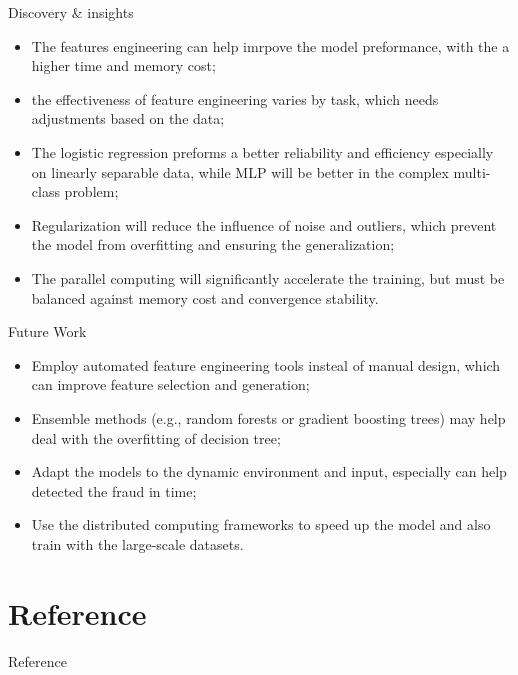\documentclass{beamer}
\begin{document}
\begin{frame}{Discovery \& insights}

  \begin{itemize}
    \item The features engineering can help imrpove the model preformance, with the a higher time and memory cost; \vspace{.25cm}
    \item the effectiveness of feature engineering varies by task, which needs adjustments based on the data; \vspace{.25cm}
    \item The logistic regression preforms a better reliability and efficiency especially on linearly separable data, while MLP will be better in the complex multi-class problem; \vspace{.25cm}
    \item Regularization will reduce the influence of noise and outliers, which prevent the model from overfitting and ensuring the generalization; \vspace{.25cm}
    \item The parallel computing will significantly accelerate the training, but must be balanced against memory cost and convergence stability.
  \end{itemize}

\end{frame}

\begin{frame}{Future Work}

  \begin{itemize}
    \item Employ automated feature engineering tools insteal of manual design, which can improve feature selection and generation; \vspace{.25cm}
    \item Ensemble methods (e.g., random forests or gradient boosting trees) may help deal with the overfitting of decision tree; \vspace{.25cm}
    \item Adapt the models to the dynamic environment and input, especially can help detected the fraud in time; \vspace{.25cm}
    \item Use the distributed computing frameworks to speed up the model and also train with the large-scale datasets. \vspace{.25cm}
  \end{itemize}

\end{frame}

\section*{Reference}
\begin{frame}[allowframebreaks]{Reference}
  \printbibliography
\end{frame}

\appendix
\end{document}
